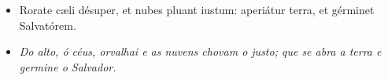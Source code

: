 \begin{paracol}{2}
  \begin{itemize}
    \item[\Antiphona] Rorate cæli désuper, et nubes pluant iustum: aperiátur terra, et gérminet Salvatórem.
      \switchcolumn
    \item[\Antiphona] \emph{Do alto, ó céus, orvalhai e as nuvens chovam o justo; que se abra a terra e germine o Salvador.}
  \end{itemize}
\end{paracol}